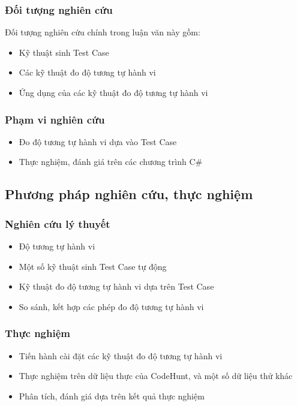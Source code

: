 \subsubsection*{Đối tượng nghiên cứu}

Đối tượng nghiên cứu chính trong luận văn này gồm:
\begin{itemize}
\item Kỹ thuật sinh Test Case
\item Các kỹ thuật đo độ tương tự hành vi
\item Ứng dụng của các kỹ thuật đo độ tương tự hành vi
\end{itemize}
	
\subsubsection*{Phạm vi nghiên cứu}
\begin{itemize}
\item Đo độ tương tự hành vi dựa vào Test Case
\item Thực nghiệm, đánh giá trên các chương trình C\#
\end{itemize}


\subsection{Phương pháp nghiên cứu, thực nghiệm}
\subsubsection*{Nghiên cứu lý thuyết}
\begin{itemize}
\item Độ tương tự hành vi
\item Một số kỹ thuật sinh Test Case tự động
\item Kỹ thuật đo độ tương tự hành vi dựa trên Test Case
\item So sánh, kết hợp các phép đo độ tương tự hành vi
\end{itemize}
		
\subsubsection*{Thực nghiệm}
\begin{itemize}
\item Tiến hành cài đặt các kỹ thuật đo độ tương tự hành vi
\item Thực nghiệm trên dữ liệu thực của CodeHunt, và một số dữ liệu thử khác
\item Phân tích, đánh giá dựa trên kết quả thực nghiệm
\end{itemize}


